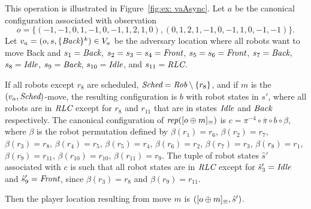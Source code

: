 \begin{example}
\label{ex: sVa}
This operation is illustrated in Figure~\ref{fig:ex: vaAsync}.
Let $a$ be the canonical configuration associated with observation $$o = \{(-1, -1, 0, 1, -1, 0, -1, 1, 2, 1, 0), (0, 1, 2, 1, -1, 0, -1, 1, 0, -1, -1)\}.$$
Let $v_a = (o, s, \{\textit{Back}\}^k) \in V_a$ be the adversary location where all robots want to move Back and 
$s_1=\textit{Back}$,  $s_2 = s_3=s_4=\textit{Front}$, $s_5 = s_6 =\textit{Front}$, $s_7=\textit{Back}$, $s_8=\textit{Idle}$, $s_9=\textit{Back}$, $s_{10}=\textit{Idle}$, and  $s_{11}= \textit{RLC}$.

If all robots except $r_8$ are scheduled, $\textit{Sched} = \textit{Rob} \setminus \{r_8\}$, and if $m$ is the $(v_a, \textit{Sched})$-move, 
the resulting configuration is $b$ with robot states in $s'$, where all robots are in $\textit{RLC}$ except for $r_8$ and $r_{11}$ that are in states $\textit{Idle}$ and  $\textit{Back}$ respectively.
The canonical configuration of $\mathit{rep}([o \oplus m]_{\equiv})$ is $c = \pi^{-4} \circ \overline \pi \circ b \circ \beta$, 
where $\beta$ is the robot permutation defined by $\beta(r_1) = r_6$, $\beta(r_2) = r_7$, 
$\beta(r_3) = r_8$, $\beta(r_4) = r_5$, $\beta(r_5) = r_4$, $\beta(r_6) = r_2$, $\beta(r_7) = r_3$, 
$\beta(r_8) = r_1$, $\beta(r_9) = r_{11}$, $\beta(r_{10}) = r_{10}$, $\beta(r_{11}) = r_9$.
The tuple of robot states $\hat{s}'$ associated with $c$ is such that all robot states are in $\textit{RLC}$ except 
for $\hat s'_ 3=\textit{Idle}$ and $\hat s'_9 = \textit{Front}$, since $\beta(r_3)= r_8$ and $\beta(r_{9}) = r_{11}$.

Then the player location resulting from move $m$ is $([o \oplus m]_{\equiv}, \hat{s}')$.
\begin{figure}[htbp]%
\center
\end{figure}
\end{example}
